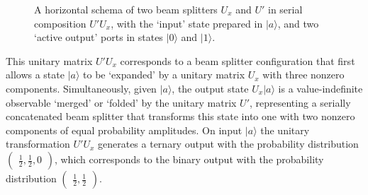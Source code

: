 \documentclass[%
 reprint,
 superscriptaddress,
 showpacs,
 showkeys,
 nofootinbib,
  amsmath,amssymb,
 pra,
  longbibliography,
  floatfix,
 ]{revtex4-2}
\theoremstyle{definition}
\begin{document}
\begin{figure}
\begin{center}
\resizebox{.46\textwidth}{!}{
\begin{tikzpicture}  [scale=1]
\tikzstyle{every path}=[line width=1pt]

\tikzset{->-/.style={decoration={
  markings,
  mark=at position #1 with {\arrow{>}}},postaction={decorate}}}



\draw (0,0) rectangle (4,4);
\draw (6,0) rectangle (10,4);
\draw[->-=.5] (4,3) -- (6,3);
\draw[->-=.5] (4,2) -- (6,2);
\draw[->-=.5] (4,1) -- (6,1);
\draw[->-=.5,dashed] (-2,3) -- (0,3);
\draw[->-=.5,dashed] (-2,2) -- (0,2);
\draw[->-=.5] (-2,1) -- (0,1);
\draw[->-=.5] (10,3) -- (12,3);
\draw[->-=.5] (10,2) -- (12,2);
\draw[->-=.5,dashed] (10,1) -- (12,1);
\node at (2,2) {\Huge $U_x$};
\node at (8,2) {\Huge $U'$};

\node at (-3,3) {\Huge $\vert a'' \rangle$};
\node at (-3,2) {\Huge $\vert a' \rangle$};
\node at (-3,1) {\Huge $\vert a \rangle$};
\node at (5,3.5) {\Large $\vert 3' \rangle$};
\node at (5,2.5) {\Large $\vert 2' \rangle$};
\node at (5,0.5) {\Large $\vert 1' \rangle$};
\node at (13,3) {\Huge $\vert 0 \rangle$};
\node at (13,2) {\Huge $\vert 1 \rangle$};
\node at (13,1) {\Huge $\vert 2 \rangle$};
\end{tikzpicture}
}
\end{center}
                \caption{A horizontal schema of two beam splitters $U_x$ and $U'$ in serial composition $U'U_x$,
with the `input' state prepared in $\vert a\rangle$,
and two `active output' ports in states $\vert 0\rangle$ and $\vert 1\rangle$.}
\label{2023-viext-souubone2}
\end{figure}



This unitary matrix $U'U_x$ corresponds to a beam splitter configuration that first allows a state $\vert a\rangle$ to be `expanded' by a unitary matrix $U_x$ with three nonzero components. Simultaneously,
given $\vert a\rangle$, the output state $U_x\vert a\rangle$ is a value-indefinite observable `merged' or `folded' by the unitary matrix $U'$,
representing a serially concatenated beam splitter that transforms this state
into one with two nonzero components of equal probability amplitudes.
On input $\vert a\rangle $ the unitary transformation  $U'U_x$ generates a ternary output
with the probability distribution
$\begin{pmatrix}\frac{1}{2},\frac{1}{2},0\end{pmatrix}$, which corresponds to the binary output with the probability distribution
$\begin{pmatrix}\frac{1}{2},\frac{1}{2}\end{pmatrix}$.
\end{document}
